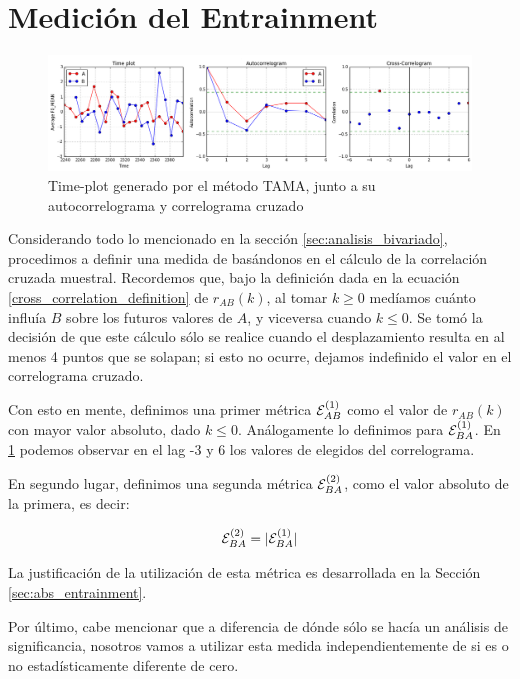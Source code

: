 \section{Medición del Entrainment}
\label{sec:method_entrainment}

\begin{figure}
\centering
\includegraphics[width=15cm]{images/time_plot_with_cross_correlation.png}
\caption{Time-plot generado por el método TAMA, junto a su autocorrelograma y correlograma cruzado}
\label{fig:time_plot_with_bivariate}
\end{figure}

Considerando todo lo mencionado en la sección \ref{sec:analisis_bivariado}, procedimos a definir una medida de \entrainment basándonos en el cálculo de la correlación cruzada muestral. Recordemos que, bajo la definición dada en la ecuación \ref{cross_correlation_definition} de $r_{AB}(k)$, al tomar $k \geq 0$ medíamos cuánto influía $B$ sobre los futuros valores de $A$, y viceversa cuando $k \leq 0$. Se tomó la decisión de que este cálculo sólo se realice cuando el desplazamiento resulta en al menos 4 puntos que se solapan; si esto no ocurre, dejamos indefinido el valor en el correlograma cruzado.

Con esto en mente, definimos una primer métrica $\mathcal{E}_{AB}^{(1)}$ como el valor de $r_{AB}(k)$ con mayor valor absoluto, dado $k \leq 0$. Análogamente lo definimos para $\mathcal{E}_{BA}^{(1)}$. En \ref{fig:time_plot_with_bivariate} podemos observar en el lag -3 y 6 los valores de \entrainment elegidos del correlograma.

En segundo lugar, definimos una segunda métrica $\mathcal{E}_{BA}^{(2)}$, como el valor absoluto de la primera, es decir:

\begin{equation}
\mathcal{E}_{BA}^{(2)} = |\mathcal{E}_{BA}^{(1)}|
\end{equation}

La justificación de la utilización de esta métrica es desarrollada en la Sección \ref{sec:abs_entrainment}.

Por último, cabe mencionar que a diferencia de \cite{KOU2008.2} dónde sólo se hacía un análisis de significancia, nosotros vamos a utilizar esta medida independientemente de si es o no estadísticamente diferente de cero.
